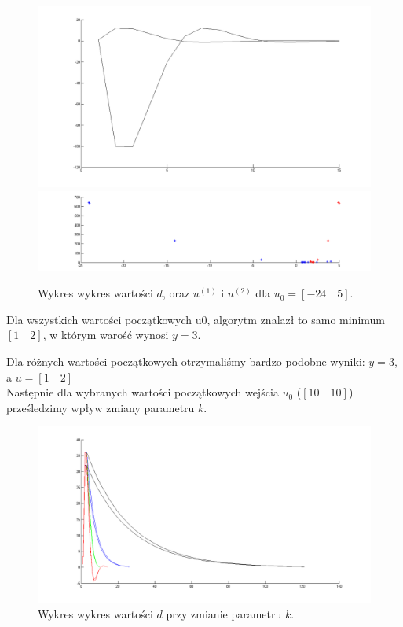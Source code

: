 \documentclass[a4paper,10pt]{article}
\begin{document}
\begin{figure}[!h]
    \centering
	\includegraphics[width=120mm]{CW4-alg3fun1-u-24_5-k01-d.png}
	\includegraphics[width=120mm]{CW4-alg3fun1-u-24_5-k01-u.png}
	\caption{Wykres wykres wartości $d$, oraz $u^{(1)}$ i $u^{(2)}$ dla $u_0=[-24 \quad 5]$.}
    \label{fig:Rysunek}
\end{figure}

Dla wszystkich wartości początkowych u0, algorytm znalazł to samo minimum $[1 \quad 2]$, w którym warość wynosi $y=3$.

Dla różnych wartości początkowych otrzymaliśmy bardzo podobne wyniki: $y=3$, a $u=[1 \quad 2]$\\

Następnie dla wybranych wartości początkowych wejścia $u_0$ ($[10 \quad 10]$) prześledzimy wpływ zmiany parametru $k$.
\begin{figure}[!h]
    \centering
	\includegraphics[width=120mm]{CW4-alg3fun1-u10_10-k001_01-d.png}
	\caption{Wykres wykres wartości $d$ przy zmianie parametru $k$.}
    \label{fig:Rysunek}
\end{figure}
\end{document}
